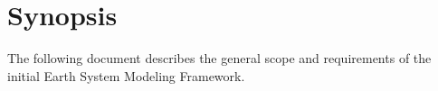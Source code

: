 \section{Synopsis}

The following document describes the general scope and requirements
of the initial Earth System Modeling Framework.








